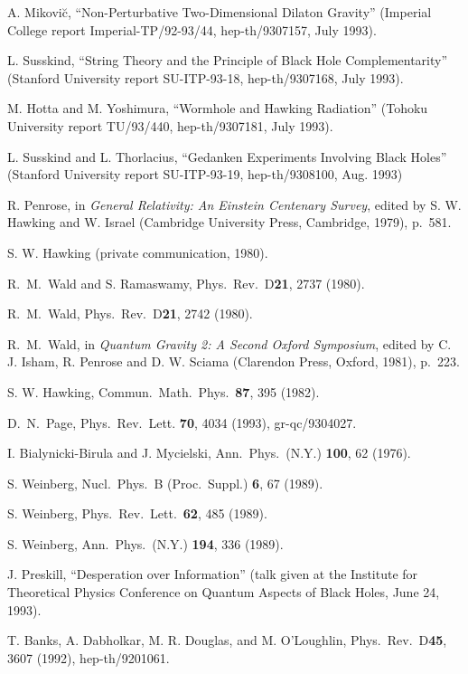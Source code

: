 \begin{thebibliography}{999}
 A. Mikovi\u{c}, ``Non-Perturbative Two-Dimensional
Dilaton
Gravity'' (Imperial College report Imperial-TP/92-93/44,
hep-th/9307157,
July 1993).

 L. Susskind, ``String Theory and the Principle of Black
Hole
Complementarity'' (Stanford University report SU-ITP-93-18,
hep-th/9307168,
July 1993).

 M. Hotta and M. Yoshimura, ``Wormhole and Hawking
Radiation''
(Tohoku University report TU/93/440, hep-th/9307181, July 1993).

 L. Susskind and L. Thorlacius, ``Gedanken Experiments
Involving Black Holes'' (Stanford University report SU-ITP-93-19,
hep-th/9308100, Aug. 1993)

 R. Penrose, in {\em General Relativity:  An
Einstein Centenary Survey}, edited by  S. W. Hawking and
W. Israel (Cambridge University Press, Cambridge, 1979),
p.~581.

 S. W. Hawking (private communication, 1980).

 R.\ M.\ Wald and S. Ramaswamy,
Phys.\ Rev.\ D{\bf 21}, 2737 (1980).

 R.\ M.\ Wald, Phys.\ Rev.\ D{\bf 21}, 2742 (1980).

 R.\ M.\ Wald, in {\em Quantum Gravity 2:  A Second
Oxford
Symposium}, edited by C. J. Isham, R. Penrose and D. W. Sciama
(Clarendon
Press, Oxford, 1981), p.~223.

 S. W. Hawking, Commun.\ Math.\ Phys.\ {\bf 87}, 395
(1982).

 D.\ N.\ Page, Phys.\ Rev.\ Lett. {\bf 70}, 4034
(1993),
gr-qc/9304027.

 I. Bialynicki-Birula and J. Mycielski, Ann.\ Phys.\
(N.Y.)
{\bf 100}, 62 (1976).

 S. Weinberg, Nucl.\ Phys.\ B (Proc.\ Suppl.) {\bf 6}, 67
(1989).

 S. Weinberg, Phys.\  Rev.\ Lett.\ {\bf 62}, 485 (1989).

 S. Weinberg, Ann.\ Phys.\ (N.Y.) {\bf 194}, 336 (1989).

 J. Preskill, ``Desperation over Information'' (talk
given at
the
Institute for Theoretical Physics Conference on Quantum Aspects of
Black Holes,
June 24, 1993).

 T. Banks, A. Dabholkar, M. R. Douglas, and M.
O'Loughlin,
Phys.\ Rev.\ D{\bf45}, 3607 (1992), hep-th/9201061.


\end{thebibliography}
